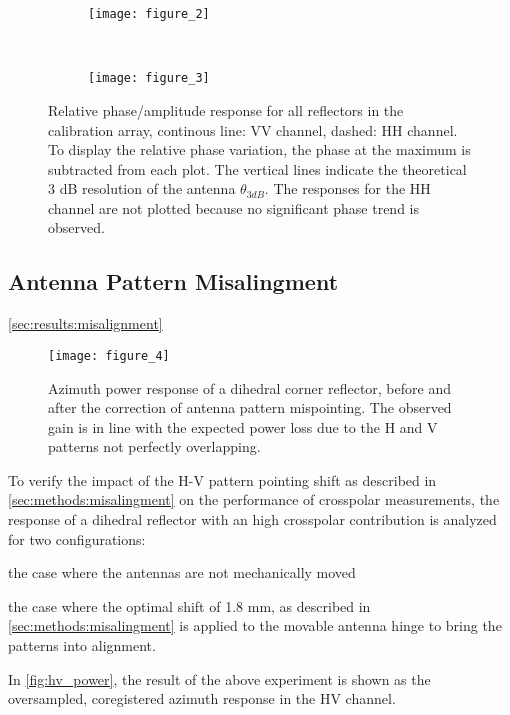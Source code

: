 \begin{figure*}[ht]
	\centering
	\begin{subfigure}[t]{\textwidth}
		\centering
		\texttt{[image: figure\_2]}
		\label{fig:phase_response_VV:uncorrected}
	\end{subfigure}\\
	\begin{subfigure}[t]{\textwidth}
		\centering
		\texttt{[image: figure\_3]}
		\label{fig:phase_response_VV:corrected}
	\end{subfigure}
	\caption{Relative phase/amplitude response for all reflectors in the calibration array, continous line: VV channel, dashed: HH channel. To display the relative phase variation, the phase at the maximum is subtracted from each plot. The vertical lines indicate the theoretical 3 dB resolution of the antenna $\theta_{3dB}$. The responses for the HH channel are not plotted because no significant phase trend is observed.}
	\label{fig:phase_response_VV}
\end{figure*}

\subsection{Antenna Pattern Misalingment}\autoref{sec:results:misalignment}
\begin{figure*}[ht!]
	\centering
	\texttt{[image: figure\_4]}
	\caption{Azimuth power response of a dihedral corner reflector, before and after the correction of antenna pattern mispointing. The observed gain is in line with the expected power loss due to the H and V patterns not perfectly overlapping.}
	\label{fig:hv_power}
\end{figure*}
To verify the impact of the H-V pattern pointing shift as described in \autoref{sec:methods:misalingment} on the performance of crosspolar measurements, the response of a dihedral reflector with an high crosspolar contribution is analyzed for two configurations:\\ \begin{enumerate*}\item the case where the antennas are not mechanically moved \item the case where the optimal shift of 1.8 mm, as described in \autoref{sec:methods:misalingment} is applied to the movable antenna hinge to bring the patterns into alignment.\\ 
\end{enumerate*}
In \autoref{fig:hv_power}, the result of the above experiment is shown as the oversampled, coregistered azimuth response in the HV channel.
